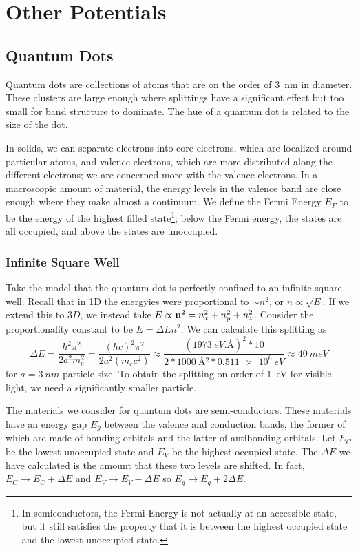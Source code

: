 \section{Other Potentials}
\subsection{Quantum Dots}
Quantum dots are collections of atoms that are on the order of \SI{3}{nm} in diameter. These clusters are large enough where splittings have a significant effect but too small for band structure to dominate. The hue of a quantum dot is related to the size of the dot. 

In solids, we can separate electrons into core electrons, which are localized around particular atoms, and valence electrons, which are more distributed along the different electrons; we are concerned more with the valence electrons. In a macroscopic amount of material, the energy levels in the valence band are close enough where they make almost a continuum. We define the Fermi Energy \(E_F\) to be the energy of the highest filled state\footnote{In semiconductors, the Fermi Energy is not actually at an accessible state, but it still satisfies the property that it is between the highest occupied state and the lowest unoccupied state.}; below the Fermi energy, the states are all occupied, and above the states are unoccupied.

\subsubsection{Infinite Square Well}
Take the model that the quantum dot is perfectly confined to an infinite square well. Recall that in 1D the energyies were proportional to \(\sim n^2\), or \(n\propto \sqrt{E}\). If we extend this to \(3D\), we instead take \(E\propto \mathbf{n}^2=  n_x^2+n_y^2+n_z^2\). Consider the proportionality constant to be \(E = \Delta E n^2\). We can calculate this splitting as
\[\Delta E = \frac{\hbar^2\pi^2}{2a^2m_e^2} = \frac{(\hbar c)^2 \pi^2}{2a^2(m_ec^2)} \approx \frac{(\SI{1973}{eV.\angstrom})^2*10}{2*\SI{1000}{\angstrom^2}*\SI{0.511e6}{eV}}\approx \SI{40}{meV}\]
for \(a=\SI{3}{nm}\) particle size. To obtain the splitting on order of \SI{1}{eV} for visible light, we need a significantly smaller particle.

The materials we consider for quantum dots are semi-conductors. These materials have an energy gap \(E_g\) between the valence and conduction bands, the former of which are made of bonding orbitals and the latter of antibonding orbitals. Let \(E_C\) be the lowest unoccupied state and \(E_V\) be the highest occupied state. The \(\Delta E\) we have calculated is the amount that these two levels are shifted. In fact, \(E_C\to E_C+\Delta E\) and \(E_V\to E_V-\Delta E\) so \(E_g\to E_g+2\Delta E\).


